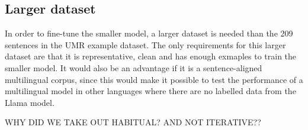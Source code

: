 \subsection{Larger dataset}
In order to fine-tune the smaller model, a larger dataset is needed than the 209 sentences in the UMR example dataset. The only requirements for this larger dataset are that it is representative, clean and has enough exmaples to train the smaller model. It would also be an advantage if it is a sentence-aligned multilingual corpus, since this would make it possible to test the performance of a multilingual model in other languages where there are no labelled data from the Llama model. 

WHY DID WE TAKE OUT HABITUAL? AND NOT ITERATIVE??
